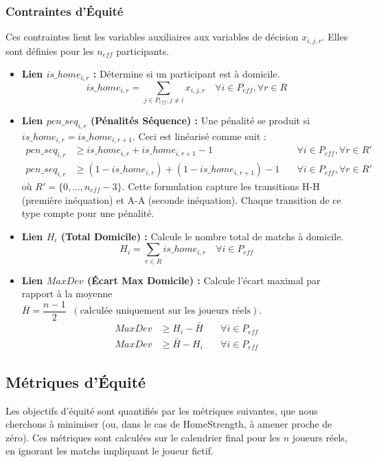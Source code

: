 \documentclass[11pt, a4paper]{article}
\begin{document}
\subsubsection{Contraintes d'Équité}
Ces contraintes lient les variables auxiliaires aux variables de décision $x_{i,j,r}$. Elles sont définies pour les $n_{eff}$ participants.
\begin{itemize}
    \item \textbf{Lien $is\_home_{i,r}$ :} Détermine si un participant est à domicile.
    \begin{equation}
        is\_home_{i,r} = \sum_{j \in P_{eff}, j \neq i} x_{i,j,r} \quad \forall i \in P_{eff}, \forall r \in R
    \end{equation}
    \item \textbf{Lien $pen\_seq_{i,r}$ (Pénalités Séquence) :} Une pénalité se produit si $is\_home_{i,r} = is\_home_{i,r+1}$. Ceci est linéarisé comme suit :
    \begin{align}
        pen\_seq_{i,r} &\ge is\_home_{i,r} + is\_home_{i,r+1} - 1 \quad &\forall i \in P_{eff}, \forall r \in R' \\
        pen\_seq_{i,r} &\ge (1 - is\_home_{i,r}) + (1 - is\_home_{i,r+1}) - 1 \quad &\forall i \in P_{eff}, \forall r \in R'
    \end{align}
    où $R' = \{0, \dots, n_{eff}-3\}$. Cette formulation capture les transitions H-H (première inéquation) et A-A (seconde inéquation). Chaque transition de ce type compte pour une pénalité.
    \item \textbf{Lien $H_i$ (Total Domicile) :} Calcule le nombre total de matchs à domicile.
    \begin{equation}
        H_i = \sum_{r \in R} is\_home_{i,r} \quad \forall i \in P_{eff}
    \end{equation}
    \item \textbf{Lien $MaxDev$ (Écart Max Domicile) :} Calcule l'écart maximal par rapport à la moyenne $\bar{H} = \dfrac{n-1}{2} \;\;(\text{calculée uniquement sur les joueurs réels})$.
    \begin{align}
        MaxDev &\ge H_i - \bar{H} \quad &\forall i \in P_{eff} \\
        MaxDev &\ge \bar{H} - H_i \quad &\forall i \in P_{eff}
    \end{align}
\end{itemize}

\subsection{Métriques d'Équité}
Les objectifs d'équité sont quantifiés par les métriques suivantes, que nous cherchons à minimiser (ou, dans le cas de HomeStrength, à amener proche de zéro). Ces métriques sont calculées sur le calendrier final pour les $n$ joueurs réels, en ignorant les matchs impliquant le joueur fictif.
\end{document}
